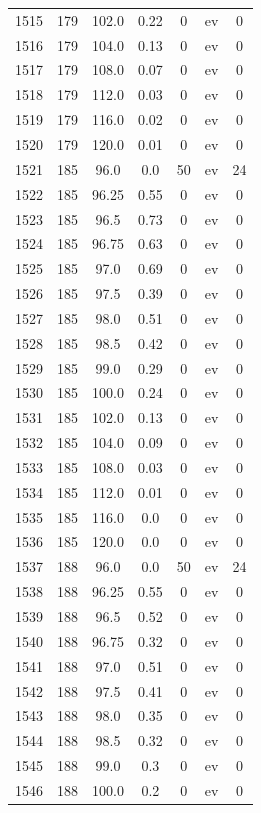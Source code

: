 \documentclass[12pt,a4paper]{article}
\begin{document}
\begin{tabular}{r|cccccc}
	1515 & 179 & 102.0 & 0.22 & 0 & ev & 0 \\
	1516 & 179 & 104.0 & 0.13 & 0 & ev & 0 \\
	1517 & 179 & 108.0 & 0.07 & 0 & ev & 0 \\
	1518 & 179 & 112.0 & 0.03 & 0 & ev & 0 \\
	1519 & 179 & 116.0 & 0.02 & 0 & ev & 0 \\
	1520 & 179 & 120.0 & 0.01 & 0 & ev & 0 \\
	1521 & 185 & 96.0 & 0.0 & 50 & ev & 24 \\
	1522 & 185 & 96.25 & 0.55 & 0 & ev & 0 \\
	1523 & 185 & 96.5 & 0.73 & 0 & ev & 0 \\
	1524 & 185 & 96.75 & 0.63 & 0 & ev & 0 \\
	1525 & 185 & 97.0 & 0.69 & 0 & ev & 0 \\
	1526 & 185 & 97.5 & 0.39 & 0 & ev & 0 \\
	1527 & 185 & 98.0 & 0.51 & 0 & ev & 0 \\
	1528 & 185 & 98.5 & 0.42 & 0 & ev & 0 \\
	1529 & 185 & 99.0 & 0.29 & 0 & ev & 0 \\
	1530 & 185 & 100.0 & 0.24 & 0 & ev & 0 \\
	1531 & 185 & 102.0 & 0.13 & 0 & ev & 0 \\
	1532 & 185 & 104.0 & 0.09 & 0 & ev & 0 \\
	1533 & 185 & 108.0 & 0.03 & 0 & ev & 0 \\
	1534 & 185 & 112.0 & 0.01 & 0 & ev & 0 \\
	1535 & 185 & 116.0 & 0.0 & 0 & ev & 0 \\
	1536 & 185 & 120.0 & 0.0 & 0 & ev & 0 \\
	1537 & 188 & 96.0 & 0.0 & 50 & ev & 24 \\
	1538 & 188 & 96.25 & 0.55 & 0 & ev & 0 \\
	1539 & 188 & 96.5 & 0.52 & 0 & ev & 0 \\
	1540 & 188 & 96.75 & 0.32 & 0 & ev & 0 \\
	1541 & 188 & 97.0 & 0.51 & 0 & ev & 0 \\
	1542 & 188 & 97.5 & 0.41 & 0 & ev & 0 \\
	1543 & 188 & 98.0 & 0.35 & 0 & ev & 0 \\
	1544 & 188 & 98.5 & 0.32 & 0 & ev & 0 \\
	1545 & 188 & 99.0 & 0.3 & 0 & ev & 0 \\
	1546 & 188 & 100.0 & 0.2 & 0 & ev & 0 \\

\end{tabular}
\end{document}
